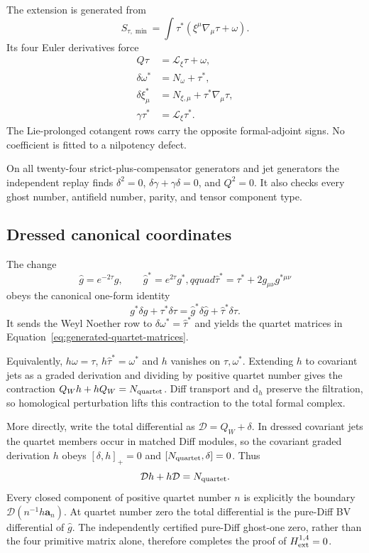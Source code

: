 \documentclass[11pt]{article}
\theoremstyle{definition}
\theoremstyle{remark}
\newcommand{\dd}{\mathrm d}
\begin{document}
The extension is generated from
\[
 S_{\tau,\min}
 =\int\tau^*(\xi^\mu\nabla_\mu\tau+\omega).
\]
Its four Euler derivatives force
\begin{align*}
 Q\tau&=\mathcal L_\xi\tau+\omega,\\
 \delta\omega^*&=N_\omega+\tau^*,\\
 \delta\xi^*_{\mu}&=N_{\xi,\mu}+\tau^*\nabla_\mu\tau,\\
 \gamma\tau^*&=\mathcal L_\xi\tau^*.
\end{align*}
The Lie-prolonged cotangent rows carry the opposite formal-adjoint signs.  No
coefficient is fitted to a nilpotency defect.

On all twenty-four strict-plus-compensator generators and jet generators the
independent replay finds
$\delta^2=0$, $\delta\gamma+\gamma\delta=0$, and $Q^2=0$.  It also checks
every ghost number, antifield number, parity, and tensor component type.

\subsection{Dressed canonical coordinates}

The change
\[
 \widehat g=e^{-2\tau}g,\qquad
 \widehat g^*=e^{2\tau}g^*,qquad
 \widehat\tau^*=\tau^*+2g_{\mu\nu}g^{*\mu\nu}
\]
obeys the canonical one-form identity
\[
 g^*\delta g+\tau^*\delta\tau
 =\widehat g^*\delta\widehat g
  +\widehat\tau^*\delta\tau.
\]
It sends the Weyl Noether row to
$\delta\omega^*=\widehat\tau^*$ and yields the quartet matrices in
Equation~\ref{eq:generated-quartet-matrices}.

Equivalently, $h\omega=\tau$, $h\widehat\tau^*=\omega^*$ and $h$ vanishes on
$\tau,\omega^*$.  Extending $h$ to covariant jets as a graded derivation and
dividing by positive quartet number gives the contraction
$Q_Wh+hQ_W=N_{\rm quartet}$.  Diff transport and $\dd_h$ preserve the
filtration, so homological perturbation lifts this contraction to the total
formal complex.

More directly, write the total differential as
$\mathcal D=Q_W+\delta$.  In dressed covariant jets the quartet members occur
in matched Diff modules, so the covariant graded derivation $h$ obeys
$[\delta,h]_+=0$ and $[N_{\rm quartet},\delta]=0$.  Thus
\[
 \mathcal D h+h\mathcal D=N_{\rm quartet}.
\]
Every closed component of positive quartet number $n$ is explicitly the
boundary $\mathcal D(n^{-1}h\mathbf a_n)$.  At quartet number zero the total
differential is the pure-Diff BV differential of $\widehat g$.  The
independently certified pure-Diff ghost-one zero, rather than the four
primitive matrix alone, therefore completes the proof of
$H^{1,4}_{\rm ext}=0$.
\end{document}
